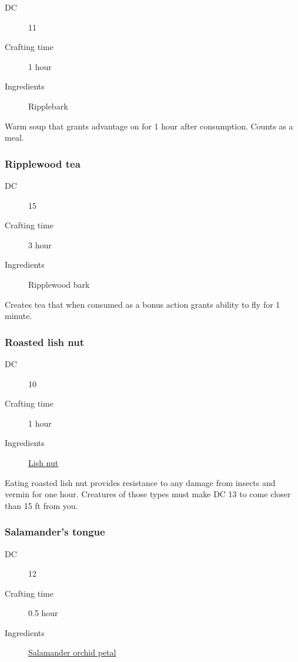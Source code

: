 \begin{description}
\item [DC] 11 \survival
\item [Crafting time] 1 hour
\item [Ingredients] Ripplebark
\end{description}

Warm soup that grants advantage on \acrobatics for 1 hour after consumption. Counts as a meal.

\subsubsection{Ripplewood tea}
\label{Ripplewood tea}

\begin{description}
\item [DC] 15 \arcana
\item [Crafting time] 3 hour
\item [Ingredients] Ripplewood bark
\end{description}

Creates tea that when consumed as a bonus action grants ability to fly for 1 minute.

\subsubsection{Roasted lish nut}
\label{Roasted lish nut}

\begin{description}
\item [DC] 10 \survival
\item [Crafting time] 1 hour
\item [Ingredients] \hyperref[Lish]{Lish nut}
\end{description}

Eating roasted lish nut provides resistance to any damage from insects and vermin for one hour. 
Creatures of those types must make DC 13 \wisdomsave to come closer than 15 ft from you.

\subsubsection{Salamander's tongue}
\label{Salamander's tongue}

\begin{description}
\item [DC] 12 \arcana
\item [Crafting time] 0.5 hour
\item [Ingredients] \hyperref[Salamander Orchid]{Salamander orchid petal}
\end{description}

